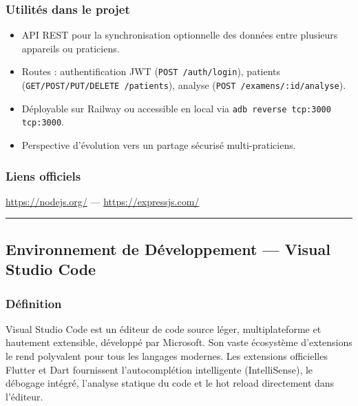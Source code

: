 \documentclass[12pt,a4paper]{report}
\begin{document}
\subsubsection*{Utilités dans le projet}
\begin{itemize}
  \item API REST pour la synchronisation optionnelle des données entre plusieurs appareils ou praticiens.
  \item Routes : authentification JWT (\texttt{POST /auth/login}), patients (\texttt{GET/POST/PUT/DELETE /patients}), analyse (\texttt{POST /examens/:id/analyse}).
  \item Déployable sur Railway ou accessible en local via \texttt{adb reverse tcp:3000 tcp:3000}.
  \item Perspective d'évolution vers un partage sécurisé multi-praticiens.
\end{itemize}

\subsubsection*{Liens officiels}
\url{https://nodejs.org/} --- \url{https://expressjs.com/}

\medskip\hrule\medskip

\subsection{Environnement de Développement --- Visual Studio Code}

\noindent\begin{minipage}[t]{0.66\textwidth}
\subsubsection*{Définition}
Visual Studio Code est un éditeur de code source léger, multiplateforme et hautement extensible, développé par Microsoft. Son vaste écosystème d'extensions le rend polyvalent pour tous les langages modernes. Les extensions officielles Flutter et Dart fournissent l'autocomplétion intelligente (IntelliSense), le débogage intégré, l'analyse statique du code et le hot reload directement dans l'éditeur.
\end{minipage}\hfill
\begin{minipage}[t]{0.30\textwidth}
\vspace{0pt}
\begin{center}
\end{center}
\end{minipage}
\end{document}

